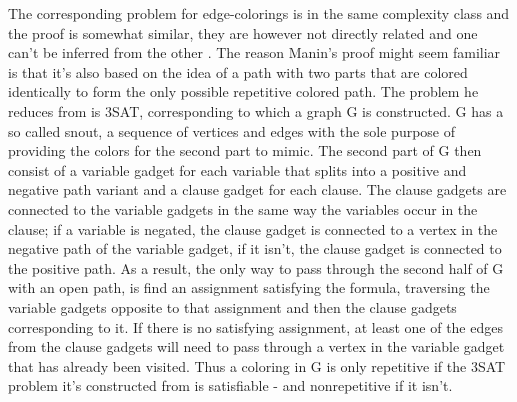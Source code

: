 \documentclass[12pt,a4paper]{article}
\begin{document}
The corresponding problem for edge-colorings is in the same complexity class and the proof is somewhat similar, they are however not directly related and one can't be inferred from the other \citep{Marx2009a}. The reason Manin's proof \citep{Manin2008} might seem familiar is that it's also based on the idea of a path with two parts that are colored identically to form the only possible repetitive colored path. The problem he reduces from is 3SAT, corresponding to which a graph G is constructed. G has a so called snout, a sequence of vertices and edges with the sole purpose of providing the colors for the second part to mimic. The second part of G then consist of a variable gadget for each variable that splits into a positive and negative path variant and a clause gadget for each clause. The clause gadgets are connected to the variable gadgets in the same way the variables occur in the clause; if a variable is negated, the clause gadget is connected to a vertex in the negative path of the variable gadget, if it isn't, the clause gadget is connected to the positive path. As a result, the only way to pass through the second half of G with an open path, is find an assignment satisfying the formula, traversing the variable gadgets opposite to that assignment and then the clause gadgets corresponding to it. If there is no satisfying assignment, at least one of the edges from the clause gadgets will need to pass through a vertex in the variable gadget that has already been visited. Thus a coloring in G is only repetitive if the 3SAT problem it's constructed from is satisfiable - and nonrepetitive if it isn't.
\newline
\end{document}
